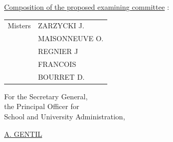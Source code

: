 \uline{Composition of the proposed examining committee} : \begin{tabular}[t]{ll}
Misters & ZARZYCKI J.\\
& MAISONNEUVE O.\\
& REGNIER J\\
& FRANCOIS\\
& BOURRET D.
\end{tabular}

\begin{flushright}
For the Secretary General,\\
the Principal Officer for\\
School and University Administration,


\uline{A. GENTIL}
\end{flushright}


